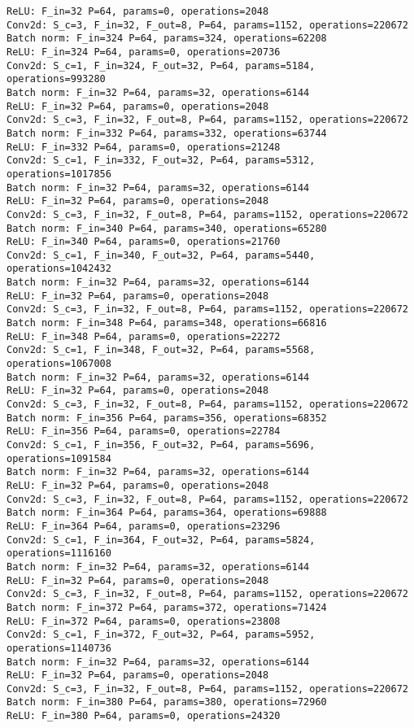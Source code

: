\begin{Verbatim}[fontsize=\small]
ReLU: F_in=32 P=64, params=0, operations=2048
Conv2d: S_c=3, F_in=32, F_out=8, P=64, params=1152, operations=220672
Batch norm: F_in=324 P=64, params=324, operations=62208
ReLU: F_in=324 P=64, params=0, operations=20736
Conv2d: S_c=1, F_in=324, F_out=32, P=64, params=5184, operations=993280
Batch norm: F_in=32 P=64, params=32, operations=6144
ReLU: F_in=32 P=64, params=0, operations=2048
Conv2d: S_c=3, F_in=32, F_out=8, P=64, params=1152, operations=220672
Batch norm: F_in=332 P=64, params=332, operations=63744
ReLU: F_in=332 P=64, params=0, operations=21248
Conv2d: S_c=1, F_in=332, F_out=32, P=64, params=5312, operations=1017856
Batch norm: F_in=32 P=64, params=32, operations=6144
ReLU: F_in=32 P=64, params=0, operations=2048
Conv2d: S_c=3, F_in=32, F_out=8, P=64, params=1152, operations=220672
Batch norm: F_in=340 P=64, params=340, operations=65280
ReLU: F_in=340 P=64, params=0, operations=21760
Conv2d: S_c=1, F_in=340, F_out=32, P=64, params=5440, operations=1042432
Batch norm: F_in=32 P=64, params=32, operations=6144
ReLU: F_in=32 P=64, params=0, operations=2048
Conv2d: S_c=3, F_in=32, F_out=8, P=64, params=1152, operations=220672
Batch norm: F_in=348 P=64, params=348, operations=66816
ReLU: F_in=348 P=64, params=0, operations=22272
Conv2d: S_c=1, F_in=348, F_out=32, P=64, params=5568, operations=1067008
Batch norm: F_in=32 P=64, params=32, operations=6144
ReLU: F_in=32 P=64, params=0, operations=2048
Conv2d: S_c=3, F_in=32, F_out=8, P=64, params=1152, operations=220672
Batch norm: F_in=356 P=64, params=356, operations=68352
ReLU: F_in=356 P=64, params=0, operations=22784
Conv2d: S_c=1, F_in=356, F_out=32, P=64, params=5696, operations=1091584
Batch norm: F_in=32 P=64, params=32, operations=6144
ReLU: F_in=32 P=64, params=0, operations=2048
Conv2d: S_c=3, F_in=32, F_out=8, P=64, params=1152, operations=220672
Batch norm: F_in=364 P=64, params=364, operations=69888
ReLU: F_in=364 P=64, params=0, operations=23296
Conv2d: S_c=1, F_in=364, F_out=32, P=64, params=5824, operations=1116160
Batch norm: F_in=32 P=64, params=32, operations=6144
ReLU: F_in=32 P=64, params=0, operations=2048
Conv2d: S_c=3, F_in=32, F_out=8, P=64, params=1152, operations=220672
Batch norm: F_in=372 P=64, params=372, operations=71424
ReLU: F_in=372 P=64, params=0, operations=23808
Conv2d: S_c=1, F_in=372, F_out=32, P=64, params=5952, operations=1140736
Batch norm: F_in=32 P=64, params=32, operations=6144
ReLU: F_in=32 P=64, params=0, operations=2048
Conv2d: S_c=3, F_in=32, F_out=8, P=64, params=1152, operations=220672
Batch norm: F_in=380 P=64, params=380, operations=72960
ReLU: F_in=380 P=64, params=0, operations=24320

\end{Verbatim}
